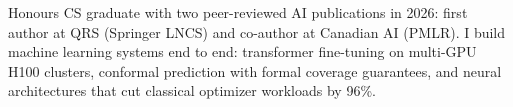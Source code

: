 


\vspace{6pt}

\begin{cvparagraph}
Honours CS graduate with two peer-reviewed AI publications in 2026: first author at QRS (Springer LNCS) and co-author at Canadian AI (PMLR). I build machine learning systems end to end: transformer fine-tuning on multi-GPU H100 clusters, conformal prediction with formal coverage guarantees, and neural architectures that cut classical optimizer workloads by 96\%.
\end{cvparagraph}

\vspace{2pt}
